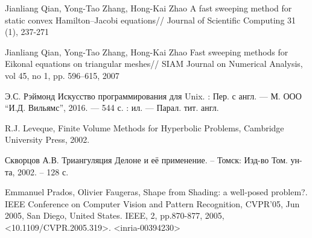 \begin{thebibliography}{99}
 {Jianliang Qian, Yong-Tao Zhang, Hong-Kai Zhao} A
  fast sweeping method for static convex Hamilton–Jacobi equations//
  Journal of Scientific Computing 31 (1), 237-271
  
 {Jianliang Qian, Yong-Tao Zhang, Hong-Kai Zhao} Fast
  sweeping methods for Eikonal equations on triangular meshes// SIAM
  Journal on Numerical Analysis, vol 45, no 1, pp. 596–615, 2007

 {Э.С. Рэймонд} Искусство программирования для Unix. :
  Пер. с англ. --- М. ООО ``И.Д. Вильямс'', 2016. --- 544 с. : ил. ---
  Парал. тит. англ.
  
 {R.J. Leveque}, Finite Volume Methods for Hyperbolic Problems, Cambridge
University Press, 2002.

 {Скворцов А.В.} Триангуляция Делоне и её применение. –
  Томск: Изд-во Том. ун-та, 2002. – 128 с.

 {Emmanuel Prados, Olivier Faugeras}, Shape from Shading: a well-posed problem?. IEEE Conference
on Computer Vision and Pattern Recognition, CVPR’05, Jun 2005, San Diego, United States. IEEE,
2, pp.870-877, 2005, <10.1109/CVPR.2005.319>. <inria-00394230>

  
\end{thebibliography}


